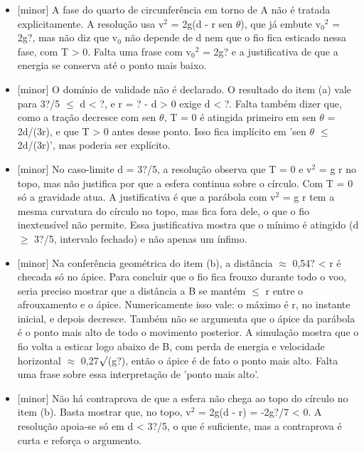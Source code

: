 \documentclass{article}%
\begin{document}
\begin{itemize}%
\item%
{[}minor{]} A fase do quarto de circunferência em torno de A não é tratada explicitamente. A resolução usa v$^2$ = 2g(d - r sen $\theta$), que já embute v$_{0}$$^2$ = 2g?, mas não diz que v$_{0}$ não depende de d nem que o fio fica esticado nessa fase, com T > 0. Falta uma frase com v$_{0}$$^2$ = 2g? e a justificativa de que a energia se conserva até o ponto mais baixo.%
\item%
{[}minor{]} O domínio de validade não é declarado. O resultado do item (a) vale para 3?/5 $\leq$ d < ?, e r = ? - d > 0 exige d < ?. Falta também dizer que, como a tração decresce com sen $\theta$, T = 0 é atingida primeiro em sen $\theta$ = 2d/(3r), e que T > 0 antes desse ponto. Isso fica implícito em 'sen $\theta$ $\leq$ 2d/(3r)', mas poderia ser explícito.%
\item%
{[}minor{]} No caso{-}limite d = 3?/5, a resolução observa que T = 0 e v$^2$ = g r no topo, mas não justifica por que a esfera continua sobre o círculo. Com T = 0 só a gravidade atua. A justificativa é que a parábola com v$^2$ = g r tem a mesma curvatura do círculo no topo, mas fica fora dele, o que o fio inextensível não permite. Essa justificativa mostra que o mínimo é atingido (d $\geq$ 3?/5, intervalo fechado) e não apenas um ínfimo.%
\item%
{[}minor{]} Na conferência geométrica do item (b), a distância $\approx$ 0,54? < r é checada só no ápice. Para concluir que o fio fica frouxo durante todo o voo, seria preciso mostrar que a distância a B se mantém $\leq$ r entre o afrouxamento e o ápice. Numericamente isso vale: o máximo é r, no instante inicial, e depois decresce. Também não se argumenta que o ápice da parábola é o ponto mais alto de todo o movimento posterior. A simulação mostra que o fio volta a esticar logo abaixo de B, com perda de energia e velocidade horizontal $\approx$ 0,27$\surd$(g?), então o ápice é de fato o ponto mais alto. Falta uma frase sobre essa interpretação de 'ponto mais alto'.%
\item%
{[}minor{]} Não há contraprova de que a esfera não chega ao topo do círculo no item (b). Basta mostrar que, no topo, v$^2$ = 2g(d - r) = -2g?/7 < 0. A resolução apoia{-}se só em d < 3?/5, o que é suficiente, mas a contraprova é curta e reforça o argumento.%
\end{itemize}%
\end{document}

